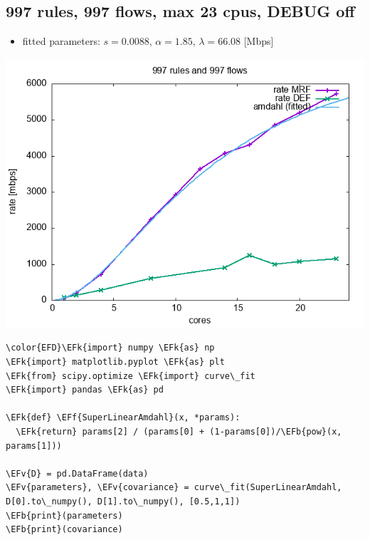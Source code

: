\documentclass[11pt]{article}
\newcommand{\EFk}[1]{\textcolor{EFk}{#1}} %
\newcommand{\EFb}[1]{\textcolor{EFb}{#1}} %
\newcommand{\EFf}[1]{\textcolor{EFf}{#1}} %
\newcommand{\EFv}[1]{\textcolor{EFv}{#1}} %
\begin{document}
\subsection*{997 rules, 997 flows, max 23 cpus, DEBUG off}
\label{sec:org13f056f}
\begin{itemize}
\item fitted parameters: \(s=0.0088\), \(\alpha=1.85\), \(\lambda=66.08\) [Mbps]
\end{itemize}
\begin{center}
\includegraphics[width=.9\linewidth]{plot-997rules-997flows-rhea-2.png}
\end{center}

\begin{Code}
\begin{Verbatim}
\color{EFD}\EFk{import} numpy \EFk{as} np
\EFk{import} matplotlib.pyplot \EFk{as} plt
\EFk{from} scipy.optimize \EFk{import} curve\_fit
\EFk{import} pandas \EFk{as} pd

\EFk{def} \EFf{SuperLinearAmdahl}(x, *params):
  \EFk{return} params[2] / (params[0] + (1-params[0])/\EFb{pow}(x, params[1]))

\EFv{D} = pd.DataFrame(data)
\EFv{parameters}, \EFv{covariance} = curve\_fit(SuperLinearAmdahl, D[0].to\_numpy(), D[1].to\_numpy(), [0.5,1,1])
\EFb{print}(parameters)
\EFb{print}(covariance)
\end{Verbatim}
\end{Code}
\end{document}

